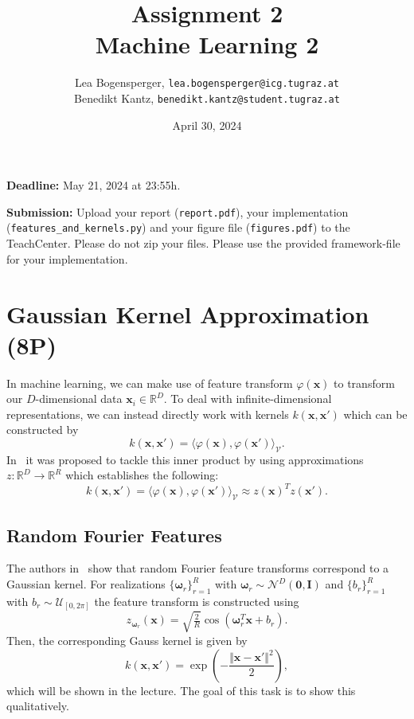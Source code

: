 \documentclass{article}
\title{{\Huge \textbf{Assignment 2}} \\ {\Large \textbf{Machine Learning 2}}}
\author{Lea Bogensperger, \texttt{lea.bogensperger@icg.tugraz.at}\vspace{-0.4cm} \\ Benedikt Kantz, \texttt{benedikt.kantz@student.tugraz.at}}
\date{April 30, 2024}
\renewcommand{\vec}[1]{\textbf{#1}}
\newcommand{\deadline}{\noindent\textbf{Deadline:}\xspace}
\newcommand{\submission}{\noindent\textbf{Submission:}\xspace}
\renewcommand{\vec}[1]{\textbf{#1}}
\begin{document}
\maketitle

\vspace{0.5cm}
\deadline
May 21, 2024 at 23:55h.

\submission 
Upload your report (\texttt{report.pdf}), your implementation (\texttt{features\_and\_kernels.py}) and your figure file (\texttt{figures.pdf}) to the TeachCenter. Please do not zip your files. Please use the provided framework-file for your implementation.


\section{Gaussian Kernel Approximation (8P)} \label{sec:randFeatKernels}
In machine learning, we can make use of feature transform $\varphi(\vec x)$ to transform our $D$-dimensional data $\vec x_i \in \mathbb{R}^D$. To deal with infinite-dimensional representations, we can instead directly work with kernels $k(\vec x,\vec x')$ which can be constructed by 
\[
k(\vec x,\vec x') = \langle \varphi(\vec x),\varphi(\vec x') \rangle_{\mathcal{V}}.
\]
In~\citep{rahimi2007random} it was proposed to tackle this inner product by using approximations $z: \mathbb{R}^{D} \to \mathbb{R}^{R}$ which establishes the following:
\begin{equation}\label{eq:approx}
k(\vec x,\vec x') = \langle \varphi(\vec x),\varphi(\vec x') \rangle_{\mathcal{V}} \approx z(\vec x)^T z (\vec x').
\end{equation}
\subsection{Random Fourier Features}
The authors in~\citep{rahimi2007random} show that random Fourier feature transforms correspond to a Gaussian kernel. For realizations $\{\boldsymbol \omega_r \}_{r=1}^R$ with $ \boldsymbol \omega_r \sim \mathcal{N}^D(\vec 0 ,\vec I)$ and $\{ b_r\}_{r=1}^R$ with $ b_r \sim \mathcal{U}_{[0,2\pi]}$ the feature transform is constructed using
\begin{equation}\label{eq:rff}
z_{\boldsymbol \omega_r} ( \vec x)=\sqrt{\tfrac{2}{R}} \cos(\boldsymbol \omega_r ^T \vec x +  b_r).
\end{equation}
Then, the corresponding Gauss kernel is given by 
\[
k(\vec x, \vec x')=\exp(-\frac{\Vert \vec x - \vec x'\Vert^2}{2}),
\]
which will be shown in the lecture. The goal of this task is to show this qualitatively. 
\end{document}
